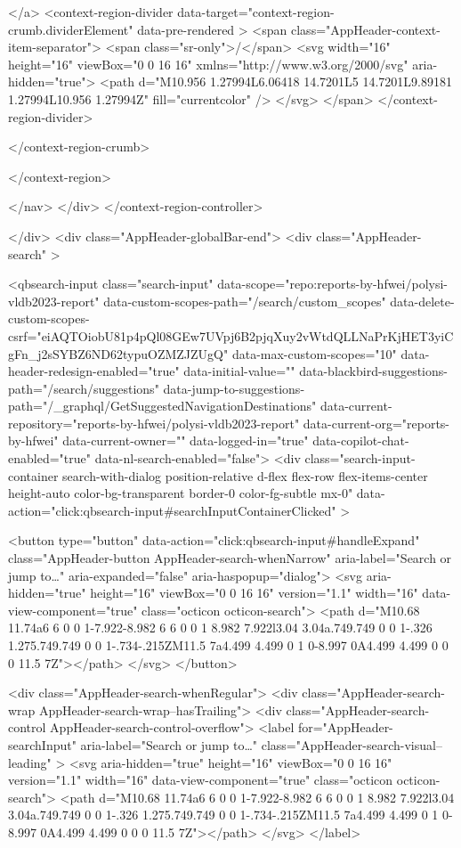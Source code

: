 </a>
      <context-region-divider data-target="context-region-crumb.dividerElement" data-pre-rendered >
  <span class="AppHeader-context-item-separator">
    <span class="sr-only">/</span>
    <svg width="16" height="16" viewBox="0 0 16 16" xmlns="http://www.w3.org/2000/svg" aria-hidden="true">
      <path d="M10.956 1.27994L6.06418 14.7201L5 14.7201L9.89181 1.27994L10.956 1.27994Z" fill="currentcolor" />
    </svg>
  </span>
</context-region-divider>

    </context-region-crumb>

</context-region>

    </nav>
  </div>
</context-region-controller>

      </div>
      <div class="AppHeader-globalBar-end">
          <div class="AppHeader-search" >
              


<qbsearch-input class="search-input" data-scope="repo:reports-by-hfwei/polysi-vldb2023-report" data-custom-scopes-path="/search/custom_scopes" data-delete-custom-scopes-csrf="eiAQTOiobU81p4pQl08GEw7UVpj6B2pjqXuy2vWtdQLLNaPrKjHET3yiCgFn_j2sSYBZ6ND62typuOZMZJZUgQ" data-max-custom-scopes="10" data-header-redesign-enabled="true" data-initial-value="" data-blackbird-suggestions-path="/search/suggestions" data-jump-to-suggestions-path="/_graphql/GetSuggestedNavigationDestinations" data-current-repository="reports-by-hfwei/polysi-vldb2023-report" data-current-org="reports-by-hfwei" data-current-owner="" data-logged-in="true" data-copilot-chat-enabled="true" data-nl-search-enabled="false">
  <div
    class="search-input-container search-with-dialog position-relative d-flex flex-row flex-items-center height-auto color-bg-transparent border-0 color-fg-subtle mx-0"
    data-action="click:qbsearch-input#searchInputContainerClicked"
  >
      
            <button type="button" data-action="click:qbsearch-input#handleExpand" class="AppHeader-button AppHeader-search-whenNarrow" aria-label="Search or jump to…" aria-expanded="false" aria-haspopup="dialog">
            <svg aria-hidden="true" height="16" viewBox="0 0 16 16" version="1.1" width="16" data-view-component="true" class="octicon octicon-search">
    <path d="M10.68 11.74a6 6 0 0 1-7.922-8.982 6 6 0 0 1 8.982 7.922l3.04 3.04a.749.749 0 0 1-.326 1.275.749.749 0 0 1-.734-.215ZM11.5 7a4.499 4.499 0 1 0-8.997 0A4.499 4.499 0 0 0 11.5 7Z"></path>
</svg>
          </button>


<div class="AppHeader-search-whenRegular">
  <div class="AppHeader-search-wrap AppHeader-search-wrap--hasTrailing">
    <div class="AppHeader-search-control AppHeader-search-control-overflow">
      <label
        for="AppHeader-searchInput"
        aria-label="Search or jump to…"
        class="AppHeader-search-visual--leading"
      >
        <svg aria-hidden="true" height="16" viewBox="0 0 16 16" version="1.1" width="16" data-view-component="true" class="octicon octicon-search">
    <path d="M10.68 11.74a6 6 0 0 1-7.922-8.982 6 6 0 0 1 8.982 7.922l3.04 3.04a.749.749 0 0 1-.326 1.275.749.749 0 0 1-.734-.215ZM11.5 7a4.499 4.499 0 1 0-8.997 0A4.499 4.499 0 0 0 11.5 7Z"></path>
</svg>
      </label>

